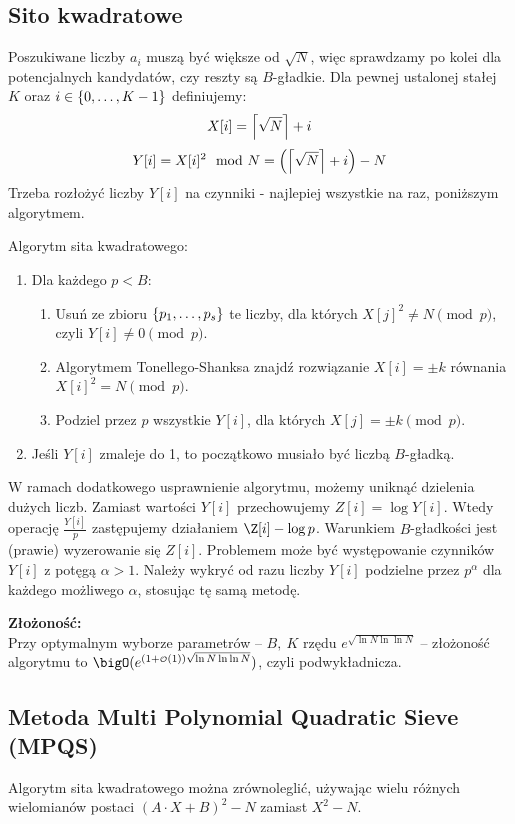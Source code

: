 \subsection{Sito kwadratowe}
Poszukiwane liczby \( a_i \) muszą być większe od \( \sqrt{N} \), więc sprawdzamy po kolei dla potencjalnych kandydatów, czy reszty są \( B \)-gładkie.
Dla pewnej ustalonej stałej \( K \) oraz \( i \in \set{0, \dots, K-1} \) definiujemy:
\[ X[i] = \left\lceil\sqrt{N}\right\rceil + i \]
\[ Y[i] = X[i]^2 \mod N = \left(\left\lceil\sqrt{N}\right\rceil + i\right) - N \]
Trzeba rozłożyć liczby \( Y[i] \) na czynniki - najlepiej wszystkie na raz, poniższym algorytmem.
\begin{greyframe}
    Algorytm sita kwadratowego:
    \begin{enumerate}
        \item Dla każdego \( p < B \):
        \begin{enumerate}
            \item Usuń ze zbioru \( \set{p_1, \dots, p_s} \) te liczby, dla których \( X[j]^2 \neq N \pmod{p} \), \\ czyli \( Y[i] \neq 0 \pmod{p} \).
            \item Algorytmem Tonellego-Shanksa znajdź rozwiązanie \( X[i] = \pm k \) równania \\ \( X[i]^2 = N \pmod{p} \).
            \item Podziel przez \( p \) wszystkie \( Y[i] \), dla których \( X[j] = \pm k \pmod{p} \).
        \end{enumerate}
        \item Jeśli \( Y[i] \) zmaleje do 1, to początkowo musiało być liczbą \( B \)-gładką.
    \end{enumerate}
\end{greyframe}
W ramach dodatkowego usprawnienie algorytmu, możemy uniknąć dzielenia dużych liczb. Zamiast wartości \( Y[i] \) przechowujemy \( Z[i] = \log Y[i] \).
Wtedy operację \( \frac{Y[i]}{p} \) zastępujemy działaniem \( \Z[i] - \log p \). Warunkiem \( B \)-gładkości jest (prawie) wyzerowanie się \( Z[i] \).
Problemem może być występowanie czynników \( Y[i] \) z potęgą \( \alpha > 1 \). Należy wykryć od razu liczby \( Y[i] \) podzielne przez \( p^{\alpha} \) dla każdego możliwego \( \alpha \), stosując tę samą metodę.

\textbf{Złożoność:} \\
Przy optymalnym wyborze parametrów -- \( B, \ K \) rzędu \( e^{\sqrt{\ln N \ln\ln N}} \) -- złożoność algorytmu to \( \bigO(e^{(1 + {\scriptscriptstyle\mathcal{O}}(1))\sqrt{\ln N \ln\ln N}}) \), czyli podwykładnicza.

\subsection{Metoda Multi Polynomial Quadratic Sieve (MPQS)}
Algorytm sita kwadratowego można zrównoleglić, używając wielu różnych wielomianów postaci \( (A \cdot X + B)^2 - N \) zamiast \( X^2 - N \).